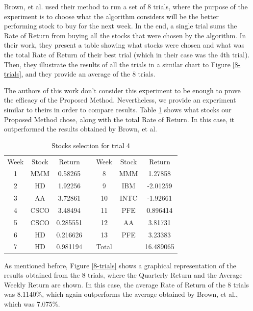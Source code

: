 \documentclass[12pt,journal,draftcls,onecolumn]{IEEEtran}
\begin{document}
Brown, et al. \cite{brown2013dynamic} used their method to run a set of 8 trials, where the purpose of the experiment is to choose what the algorithm considers will be the better performing stock to buy for the next week. In the end, a single trial sums the Rate of Return from buying all the stocks that were chosen by the algorithm. In their work, they present a table showing what stocks were chosen and what was the total Rate of Return of their best trial (which in their case was the 4th trial). Then, they illustrate the results of all the trials in a similar chart to Figure \ref{8-trials}, and they provide an average of the 8 trials.

The authors of this work don't consider this experiment to be enough to prove the efficacy of the Proposed Method. Nevertheless, we provide an experiment similar to theirs in order to compare results. Table \ref{best-trial-table} shows what stocks our Proposed Method chose, along with the total Rate of Return. In this case, it outperformed the results obtained by Brown, et al.
    
\begin{table}
  \centering
  \caption{Stocks selection for trial 4} 
  \label{best-trial-table}
    \begin{tabular}{ c c c c c c c }
        Week & Stock & Return &  & Week & Stock & Return \\ 
        1 & MMM & 0.58265 &  & 8 & MMM & 1.27858 \\ 
        2 & HD & 1.92256 &  & 9 & IBM & -2.01259 \\ 
        3 & AA & 3.72861 &  & 10 & INTC & -1.92661 \\ 
        4 & CSCO & 3.48494 &  & 11 & PFE & 0.896414 \\ 
        5 & CSCO & 0.285551 &  & 12 & AA & 3.81731 \\ 
        6 & HD & 0.216626 &  & 13 & PFE & 3.23383 \\ 
        7 & HD & 0.981194 &  & Total &  & 16.489065 \\ 
    \end{tabular} 
\end{table}

As mentioned before, Figure \ref{8-trials} shows a graphical
representation of the results obtained from the 8 trials, where the
Quarterly Return and the Average Weekly Return are shown. In this
case, the average Rate of Return of the 8 trials was 8.1140\%, which
again outperforms the average obtained by Brown, et al., which was
7.075\%.
\end{document}
